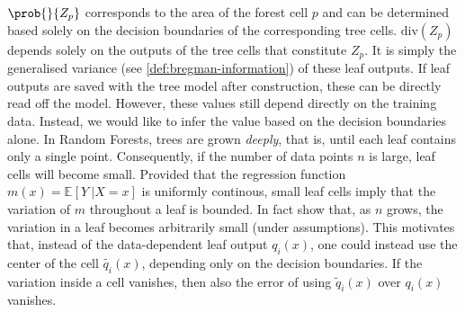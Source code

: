 \documentclass[
	twoside=false, %
]{kaobook}
\begin{document}
$\prob{}{Z_{p}}$ corresponds to the area of the forest cell $p$ and can be determined based solely on the decision boundaries of the corresponding tree cells.
$\text{div}(Z_{p})$ depends solely on the outputs of the tree cells that constitute $Z_{p}$. It is simply the generalised variance (see \ref{def:bregman-information}) of these leaf outputs. If leaf outputs are saved with the tree model after construction, these can be directly read off the model. However, these values still depend directly on the training data. Instead, we would like to infer the value based on the decision boundaries alone.
In Random Forests, trees are grown \textit{deeply}, that is, until each leaf contains only a single point. Consequently, if the number of data points $n$ is large, leaf cells will become small. Provided that the regression function $m(x) = \mathbb{E}_{}\left[ Y ~| X=x \right]$ is uniformly continous, small leaf cells imply that the variation of $m$ throughout a leaf is bounded. 
In fact \citeauthor{scornet_ConsistencyRandomForests_2015} \cite{scornet_ConsistencyRandomForests_2015} show
that, as $n$ grows, the variation in a leaf becomes arbitrarily small (under assumptions).
This motivates that, instead of the data-dependent leaf output $q_{i}(x)$, one could instead use the center of the cell $\tilde{q_{i}}(x)$, depending only on the decision boundaries. If the variation inside a cell vanishes, then also the error of using $\tilde{q}_{i}(x)$ over $q_{i}(x)$ vanishes.

\end{document}
